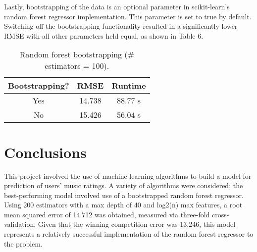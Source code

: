 \documentclass[11pt]{article}
\begin{document}
	Lastly, bootstrapping of the data is an optional parameter
	in scikit-learn's random forest regressor implementation.
	This parameter is set to true by default. Switching off the
	bootstrapping functionality resulted in a significantly
	lower RMSE with all other parameters held equal, as shown in
	Table 6.
	
	\begin{table}[h!]
		\begin{center}
			\caption{Random forest bootstrapping (\# estimators = 100).}
			\begin{tabular}{ c c c }
				\hline
				Bootstrapping? & RMSE & Runtime \\ \hline
				Yes & 14.738 & 88.77 s \\
				No & 15.426 & 56.04 s \\
				\hline
			\end{tabular}
		\end{center}
	\end{table}
	
	\section{Conclusions}
	
	This project involved the use of machine learning algorithms
	to build a model for prediction of users' music ratings. A
	variety of algorithms were considered; the best-performing
	model involved use of a bootstrapped random forest regressor. Using 200
	estimators with a max depth of 40 and log2(n) max features, 
	a root mean squared error of 14.712 was obtained, measured
	via three-fold cross-validation. Given that the winning
	competition error was 13.246, this model represents a
	relatively successful implementation of the random forest regressor
	to the problem.
	
\end{document}

